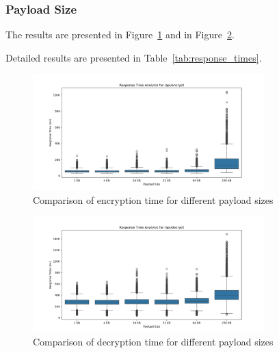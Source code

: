 \documentclass[cic,tc,english]{iiufrgs}
\begin{document}
            \subsubsection{Payload Size}
                The results are presented in Figure~\ref{fig:encrypt_payload_size} and in Figure~\ref{fig:decrypt_payload_size}.

                Detailed results are presented in Table~\ref{tab:response_times}.

                \begin{figure}
                    \centering
                    \includegraphics[width=0.8\textwidth]{images/phase2/response_time_api_encrypt.png}
                    \caption{Comparison of encryption time for different payload sizes}
                    \label{fig:encrypt_payload_size}
                \end{figure}

                \begin{figure}
                    \centering
                    \includegraphics[width=0.8\textwidth]{images/phase2/response_time_api_decrypt.png}
                    \caption{Comparison of decryption time for different payload sizes}
                    \label{fig:decrypt_payload_size}
                \end{figure}
\end{document}
